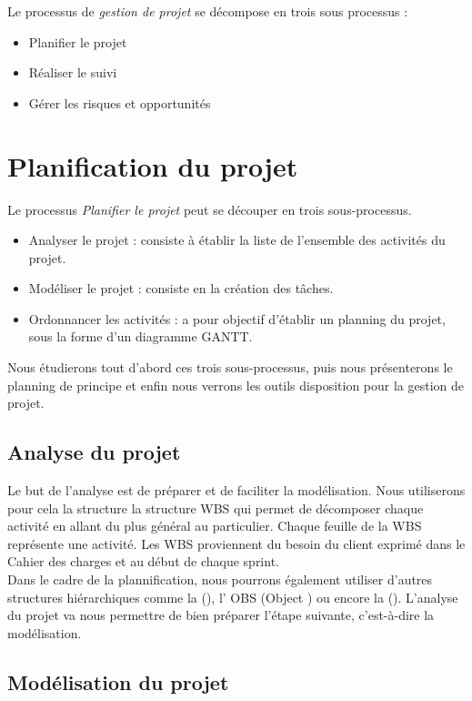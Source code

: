 Le processus de \textit{gestion de projet} se décompose en trois sous processus : 
\begin{itemize}
\item Planifier le projet
\item Réaliser le suivi
\item Gérer les risques et opportunités
\end{itemize}

\section{Planification du projet}

Le processus \textit{Planifier le projet} peut se découper en trois sous-processus.

\begin{itemize}
\item Analyser le projet : consiste à établir la liste de l'ensemble des activités du projet.
\item Modéliser le projet : consiste en la création des tâches.
\item Ordonnancer les activités : a pour objectif d'établir un planning du projet, sous la forme d'un diagramme GANTT.
\end{itemize}

Nous étudierons tout d'abord ces trois sous-processus, puis nous présenterons le planning de principe et enfin nous verrons les outils  disposition pour la gestion de projet. 

\subsection{Analyse du projet}
Le but de l'analyse est de préparer et de faciliter la modélisation. Nous utiliserons pour cela la structure la structure WBS qui permet de décomposer chaque activité en allant du plus général au particulier. Chaque feuille de la WBS représente une activité. Les WBS proviennent du besoin du client exprimé dans le Cahier des charges et au début de chaque sprint. \\

Dans le cadre de la plannification, nous pourrons également utiliser d’autres structures hiérarchiques comme la \FBSCourt (\FBS), l’ OBS (Object \BS) ou encore la \RBSCourt (\RBS). L’analyse du projet va nous permettre de bien préparer l’étape suivante, c’est-à-dire la modélisation.


\subsection{Modélisation du projet}

